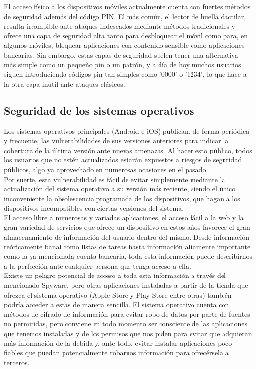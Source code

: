 \documentclass[11pt]{article}
\begin{document}
\newpage
{El acceso físico a los dispositivos móviles actualmente cuenta con fuertes métodos de seguridad además del código PIN. El más común, el lector de huella dactilar, resulta irrompible ante ataques indeseados mediante métodos tradicionales y ofrece una capa de seguridad alta tanto para desbloquear el móvil como para, en algunos móviles, bloquear aplicaciones con contenido sensible como aplicaciones bancarias. Sin embargo, estas capas de seguridad suelen tener una alternativa más simple como un pequeño pin o un patrón, y a día de hoy muchos usuarios siguen introduciendo códigos pin tan simples como '0000' o '1234', lo que hace a la otra capa inútil ante ataques clásicos.}

\subsection{Seguridad de los sistemas operativos}

{Los sistemas operativos principales (Android e iOS) publican, de forma periódica y frecuente, las vulnerabilidades de sus versiones anteriores para indicar la cobertura de la última versión ante nuevas amenazas. Al hacer esto público, todos los usuarios que no estén actualizados estarán expuestos a riesgos de seguridad públicos, algo ya aprovechado en numerosas ocasiones en el pasado.} \\

{Por suerte, esta vulnerabilidad es fácil de evitar simplemente mediante la actualización del sistema operativo a su versión más reciente, siendo el único inconveniente la obsolescencia programada de los dispositivos, que hagan a los dispositivos incompatibles con ciertas versiones del sistema.} \\

{El acceso libre a numerosas y variadas aplicaciones, el acceso fácil a la web y la gran variedad de servicios que ofrece un dispositivo en estos años favorece el gran almacenamiento de información del usuario dentro del mismo. Desde información teóricamente banal como listas de tareas hasta información altamente importante como la ya mencionada cuenta bancaria, toda esta información puede describirnos a la perfección ante cualquier persona que tenga acceso a ella.} \\

{Existe un peligro potencial de acceso a toda esta información a través del mencionado Spyware, pero otras aplicaciones instaladas a partir de la tienda que ofrezca el sistema operativo (Apple Store y Play Store entre otras) también podría acceder a estas de manera sencilla. El sistema operativo cuenta con métodos de cifrado de información para evitar robo de datos por parte de fuentes no permitidas, pero conviene en todo momento ser consciente de las aplicaciones que tenemos instaladas y de los permisos que nos piden para evitar que adquieran más información de la debida y, ante todo, evitar instalar aplicaciones poco fiables que puedan potencialmente robarnos información para ofrecérsela a terceros.}
\end{document}
